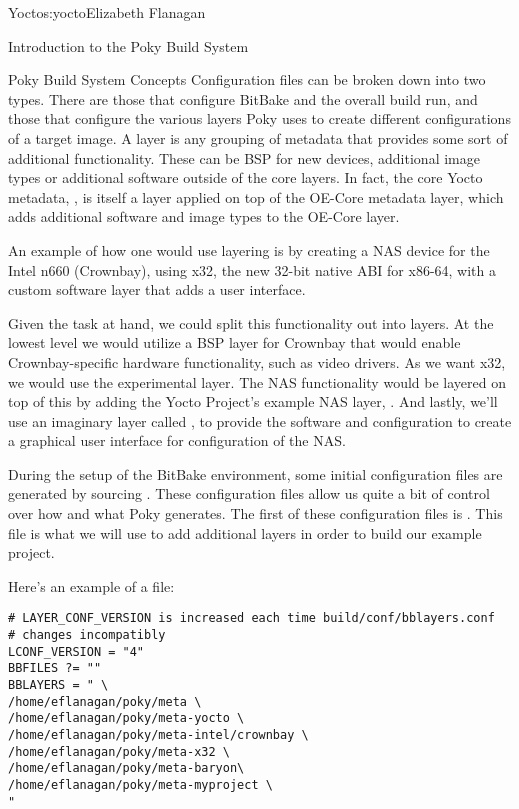 \begin{aosachapter}{Yocto}{s:yocto}{Elizabeth Flanagan}
\begin{aosasect1}{Introduction to the Poky Build System}
\begin{aosasect2}{Poky Build System Concepts}
Configuration files can be broken down into two types. There are those that
configure BitBake and the overall build run, and those that configure
the various layers Poky uses to create different configurations of a
target image. A layer is any grouping of metadata that provides some
sort of additional functionality. These can be BSP for new devices,
additional image types or additional software outside of the core
layers. In fact, the core Yocto metadata, , is itself a
layer applied on top of the OE-Core metadata layer,  which adds
additional software and image types to the OE-Core layer.

An example of how one would use layering is by creating a NAS device
for the Intel n660 (Crownbay), using x32, the new 32-bit native
ABI for x86-64, with a custom software layer that adds a user
interface.

Given the task at hand, we could split this functionality out into
layers. At the lowest level we would utilize a BSP layer for Crownbay
that would enable Crownbay-specific hardware functionality, such as
video drivers. As we want x32, we would use the experimental 
layer. The NAS functionality would be layered on top of this by adding
the Yocto Project's example NAS layer, . And lastly, we'll
use an imaginary layer called , to provide the software
and configuration to create a graphical user interface for
configuration of the NAS.

During the setup of the BitBake environment, some initial configuration files are generated by sourcing .
These configuration files allow us quite a bit of control over how and
what Poky generates. The first of these configuration files is
. This file is what we will use to add additional layers
in order to build our example project. 

\pagebreak

\noindent Here's an example of a  file:

\begin{verbatim}
# LAYER_CONF_VERSION is increased each time build/conf/bblayers.conf
# changes incompatibly
LCONF_VERSION = "4"
BBFILES ?= ""
BBLAYERS = " \
/home/eflanagan/poky/meta \
/home/eflanagan/poky/meta-yocto \
/home/eflanagan/poky/meta-intel/crownbay \
/home/eflanagan/poky/meta-x32 \
/home/eflanagan/poky/meta-baryon\
/home/eflanagan/poky/meta-myproject \
"
\end{verbatim}


\end{aosasect2}
\end{aosasect1}
\end{aosachapter}
